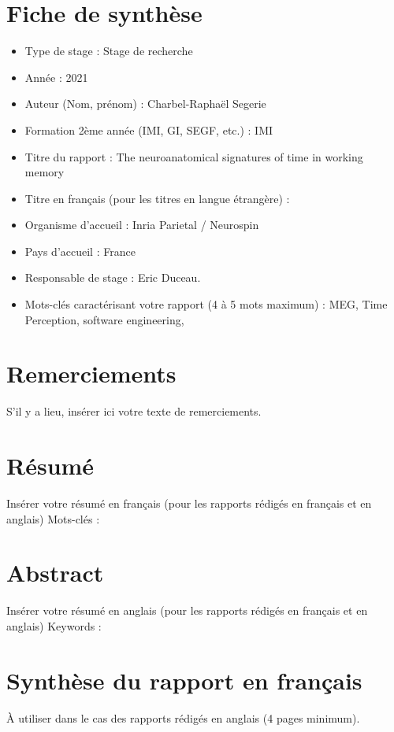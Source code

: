 \chapter*{\centering Fiche de synthèse}
\begin{itemize}
    \item Type de stage : Stage de recherche
    \item Année : 2021
    \item Auteur (Nom, prénom) : Charbel-Raphaël Segerie
    \item Formation 2ème année (IMI, GI, SEGF, etc.) : IMI
    \item Titre du rapport : The neuroanatomical signatures of time in working memory
    \item Titre en français (pour les titres en langue étrangère) : 
    \item Organisme d’accueil : Inria Parietal / Neurospin
    \item Pays d’accueil : France
    \item Responsable de stage : Eric Duceau.
    \item Mots-clés caractérisant votre rapport (4 à 5 mots maximum) : MEG, Time Perception, software engineering, 
\end{itemize}

\chapter*{\centering Remerciements}

S'il y a lieu, insérer ici votre texte de remerciements.


\chapter*{\centering Résumé}

Insérer votre résumé en français (pour les rapports rédigés en français et en anglais)
Mots-clés :

\chapter*{\centering Abstract}

Insérer votre résumé en anglais (pour les rapports rédigés en français et en anglais)
Keywords :

\chapter*{\centering Synthèse du rapport en français}

À utiliser dans le cas des rapports rédigés en anglais (4 pages minimum).
